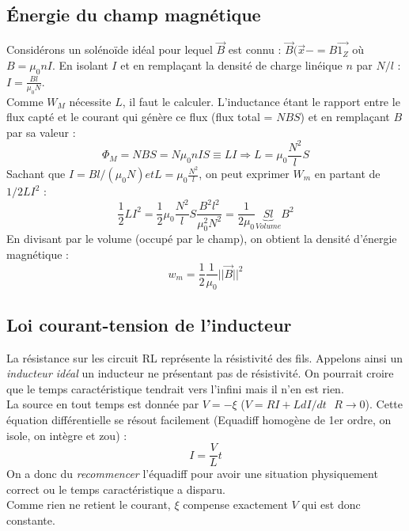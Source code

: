 \documentclass	[11pt, a4paper, openany]{book}
\begin{document}
\subsection{Énergie du champ magnétique}
Considérons un solénoïde idéal pour lequel $\vec{B}$ est connu : $\vec{B}(\vec{x}- = B\vec{1_Z}$ où $B = \mu_0nI$. En isolant $I$ et en remplaçant la densité de charge linéique $n$ par $N/l$ : $I = \frac{Bl}{\mu_0N}$.\\

Comme $W_M$ nécessite $L$, il faut le calculer. L'inductance étant le rapport entre le flux capté et le courant qui génère ce flux (flux total = $NBS$) et en remplaçant $B$ par sa valeur : 
\begin{equation}
	\Phi_M = NBS = N\mu_0nIS \equiv LI \Rightarrow L = \mu_0\frac{N^2}{l}S
\end{equation}
Sachant que $I = Bl / (\mu_0N) et L = \mu_0\frac{N^2}{l}$, on peut exprimer $W_m$ en partant de $1/2LI^2$ :
\begin{equation}
	\frac{1}{2}LI^2 = \frac{1}{2}\mu_0\frac{N^2}{l}S\frac{B^2l^2}{\mu_0^2N^2} = \frac{1}{2\mu_0}\underbrace{Sl}_{Volume}B^2
\end{equation}
En divisant par le volume (occupé par le champ), on obtient la densité d'énergie magnétique : 
\begin{equation}
	w_m = \frac{1}{2}\frac{1}{\mu_0}||\vec{B}||^2
\end{equation}

\subsection{Loi courant-tension de l'inducteur}
La résistance sur les circuit RL représente la résistivité des fils. Appelons ainsi un \textit{inducteur idéal} un inducteur ne présentant pas de résistivité. On pourrait croire que le temps caractéristique tendrait vers l'infini mais il n'en est rien.\\
La source en tout temps est donnée par $V = -\xi$ ($V = RI + L dI/dt \ \ \ R \rightarrow 0$). Cette équation différentielle se résout facilement (Equadiff homogène de 1er ordre, on isole, on intègre et zou) : 
\begin{equation}
	I = \frac{V}{L}t
\end{equation}
On a donc du \textit{recommencer} l'équadiff pour avoir une situation physiquement correct ou le temps caractéristique a disparu.\\
Comme rien ne retient le courant, $\xi$ compense exactement $V$ qui est donc constante.
\end{document}
